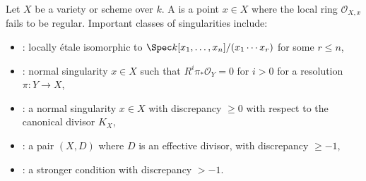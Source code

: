 \begin{definition} \label{definition:singularity_of_a_scheme}
Let $X$ be a variety or scheme over $k$. A  is a point $x \in X$ where the local ring $\mathcal{O}_{X,x}$ fails to be regular. Important classes of singularities include:  
\begin{itemize}
\item {}: locally étale isomorphic to $\Spec k[x_1,\dots,x_n]/(x_1 \cdots x_r)$ for some $r \leq n$,
\item {}: normal singularity $x \in X$ such that $R^i \pi_* \mathcal{O}_Y = 0$ for $i > 0$ for a resolution $\pi: Y \to X$,
\item {}: a normal singularity $x \in X$ with discrepancy $\geq 0$ with respect to the canonical divisor $K_X$,
\item {}: a pair $(X,D)$ where $D$ is an effective divisor, with discrepancy $\geq -1$,
\item {}: a stronger condition with discrepancy $> -1$.
\end{itemize}  
\end{definition}